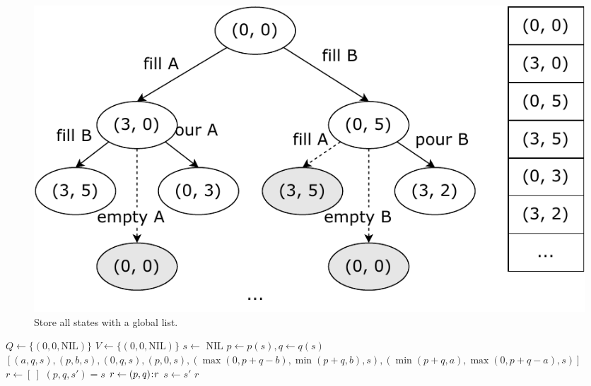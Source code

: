 \documentclass[b5paper]{article}
\begin{document}
\begin{figure}[htbp]
  \centering
  \includegraphics[scale=0.5]{img/water-jugs}
  \caption{Store all states with a global list.}
  \label{fig:water-jugs}
\end{figure}

\begin{algorithmic}[1]
  \State $Q \gets \{(0, 0, \text{NIL})\}$  
  \State $V \gets \{(0, 0, \text{NIL})\}$  
    \State $s \gets$ 
      \State \Return {}
    \Else
          \State {}
          \State {}
        \EndIf
      \EndFor
    \EndIf
  \EndWhile
  \State \Return NIL
\EndFunction
\Statex
{}
  \State $p \gets p(s), q \gets q(s)$
  \State \Return $[(a, q, s), (p, b, s), (0, q, s), (p, 0, s), (\max(0, p + q - b), \min(p + q, b), s), (\min(p + q, a), \max(0, p + q - a), s)]$
\EndFunction
\Statex
{}
  \State $r \gets [\ ]$
    \State $(p, q, s') = s$
    \State $r \gets (p, q) \mathbin{\!:\!} r$
    \State $s \gets s'$
  \EndWhile
  \State \Return $r$
\EndFunction
\end{algorithmic}

\begin{Exercise}\label{ex:water-jugs-puzzle}
\end{Exercise}
\end{document}
